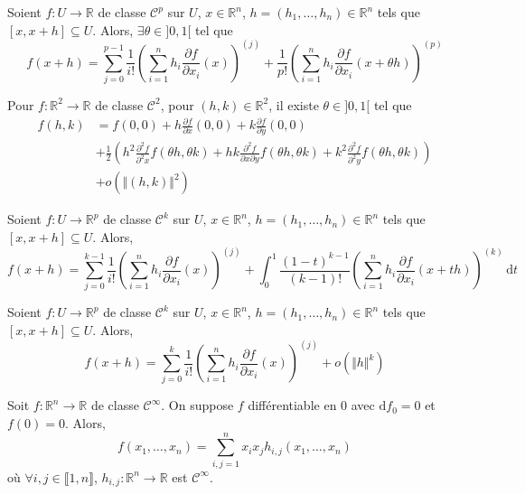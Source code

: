 	\begin{theorem}
		Soient $f : U \rightarrow \mathbb{R}$ de classe $\mathcal{C}^p$ sur $U$, $x \in \mathbb{R}^n$, $h = (h_1, \dots, h_n) \in \mathbb{R}^n$ tels que $[x,x+h] \subseteq U$. Alors, $\exists \theta \in ]0,1[$ tel que
		\[ f(x+h) = \sum_{j=0}^{p-1} \frac{1}{i!} \left( \sum_{i=1}^n h_i \frac{\partial f}{\partial x_i} (x) \right)^{(j)} + \frac{1}{p!} \left( \sum_{i=1}^n h_i \frac{\partial f}{\partial x_i} (x + \theta h) \right)^{(p)} \]
	\end{theorem}

	\begin{example}
		Pour $f : \mathbb{R}^2 \rightarrow \mathbb{R}$ de classe $\mathcal{C}^2$, pour $(h, k) \in \mathbb{R}^2$, il existe $\theta \in ]0,1[$ tel que
		\begin{align*}
			f(h,k) &= f(0,0) + h \frac{\partial f}{\partial x}(0,0) + k \frac{\partial f}{\partial y}(0,0) \\
			&+ \frac{1}{2} \left( h^2 \frac{\partial^2 f}{\partial^2 x} f(\theta h, \theta k) + hk \frac{\partial^2 f}{\partial x \partial y} f(\theta h, \theta k) + k^2 \frac{\partial^2 f}{\partial^2 y} f(\theta h, \theta k) \right) \\
			&+ o(\Vert (h,k) \Vert^2)
		\end{align*}
	\end{example}

	\begin{theorem}
		Soient $f : U \rightarrow \mathbb{R}^p$ de classe $\mathcal{C}^k$ sur $U$, $x \in \mathbb{R}^n$, $h = (h_1, \dots, h_n) \in \mathbb{R}^n$ tels que $[x,x+h] \subseteq U$. Alors,
		\[ f(x+h) = \sum_{j=0}^{k-1} \frac{1}{i!} \left( \sum_{i=1}^n h_i \frac{\partial f}{\partial x_i} (x) \right)^{(j)} + \int_0^1 \frac{(1-t)^{k-1}}{(k-1)!} \left( \sum_{i=1}^{n} h_i \frac{\partial f}{\partial x_i} (x+th) \right)^{(k)} \, \mathrm{d}t \]
	\end{theorem}

	\begin{theorem}
		Soient $f : U \rightarrow \mathbb{R}^p$ de classe $\mathcal{C}^k$ sur $U$, $x \in \mathbb{R}^n$, $h = (h_1, \dots, h_n) \in \mathbb{R}^n$ tels que $[x,x+h] \subseteq U$. Alors,
		\[ f(x+h) = \sum_{j=0}^{k} \frac{1}{i!} \left( \sum_{i=1}^n h_i \frac{\partial f}{\partial x_i} (x) \right)^{(j)} + o(\Vert h \Vert^k) \]
	\end{theorem}

	\begin{application}
		Soit $f : \mathbb{R}^n \rightarrow \mathbb{R}$ de classe $\mathcal{C}^\infty$. On suppose $f$ différentiable en $0$ avec $\mathrm{d}f_0 = 0$ et $f(0) = 0$. Alors,
		\[ f(x_1, \dots, x_n) = \sum_{i,j=1}^n x_i x_j h_{i,j}(x_1, \dots, x_n) \]
		où $\forall i,j \in \llbracket 1, n \rrbracket$, $h_{i,j} : \mathbb{R}^n \rightarrow \mathbb{R}$ est $\mathcal{C}^\infty$.
	\end{application}

